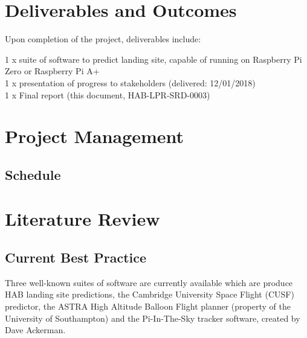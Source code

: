 \documentclass[11pt]{article}
\begin{document}
\FloatBarrier

\section{Deliverables and Outcomes}
Upon completion of the project, deliverables include:

1 x suite of software to predict landing site, capable of running on Raspberry Pi Zero or Raspberry Pi A+ \\
1 x presentation of progress to stakeholders (delivered: 12/01/2018) \\
1 x Final report (this document, HAB-LPR-SRD-0003)\\

\section{Project Management}



\subsection{Schedule}


\section{Literature Review}

\subsection{Current Best Practice}

Three well-known suites of software are currently available which are produce HAB landing site predictions, the Cambridge University Space Flight (CUSF) predictor, the ASTRA High Altitude Balloon Flight planner (property of the University of Southampton) and the Pi-In-The-Sky tracker software, created by Dave Ackerman. \\
\end{document}
